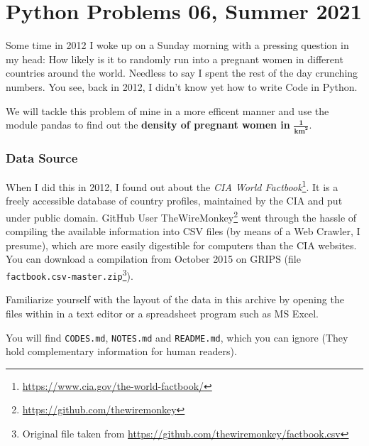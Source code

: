 \documentclass[
	english,
	fontsize=10pt,
	parskip=half,
	titlepage=true,
	DIV=12
]{scrartcl}
\begin{document}
\part*{Python Problems 06, Summer 2021}
Some time in 2012 I woke up on a Sunday morning with a pressing question in my head: How likely is it to randomly run into a pregnant women in different countries around the world. Needless to say I spent the rest of the day crunching numbers. You see, back in 2012, I didn't know yet how to write Code in Python.

We will tackle this problem of mine in a more efficent manner and use the module pandas to find out the \textbf{density of pregnant women in} $\mathbf{\frac{1}{\text{km}^2}}$.

\section{Data Source}
When I did this in 2012, I found out about the \emph{CIA World Factbook}\footnote{\url{https://www.cia.gov/the-world-factbook/}}. It is a freely accessible database of country profiles, maintained by the CIA and put under public domain. GitHub User TheWireMonkey\footnote{\url{https://github.com/thewiremonkey}} went through the hassle of compiling the available information into CSV files (by means of a Web Crawler, I presume), which are more easily digestible for computers than the CIA websites. You can download a compilation from October 2015 on GRIPS (file \texttt{factbook.csv-master.zip}\footnote{Original file taken from \url{https://github.com/thewiremonkey/factbook.csv}}).

Familiarize yourself with the layout of the data in this archive by opening the files within in a text editor or a spreadsheet program such as MS Excel.

You will find \texttt{CODES.md}, \texttt{NOTES.md} and \texttt{README.md}, which you can ignore (They hold complementary information for human readers).
\end{document}
